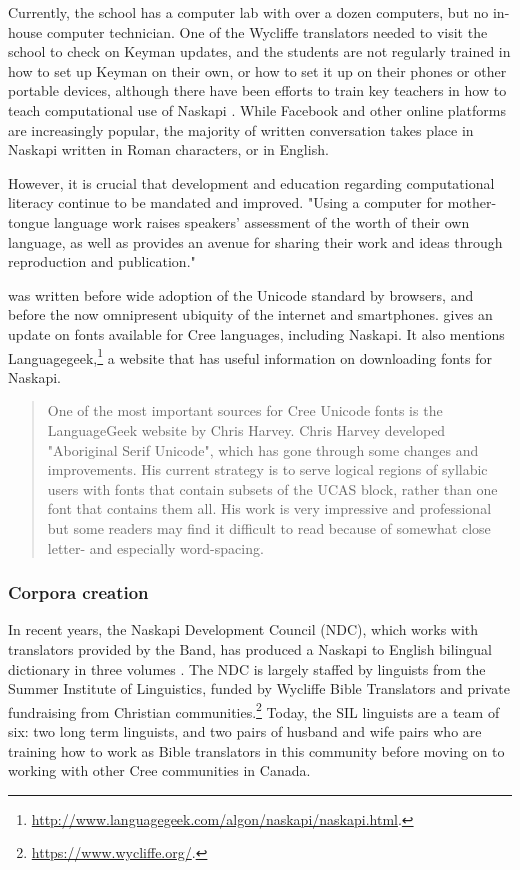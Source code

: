 Currently, the school has a computer lab with over a dozen computers, but no in-house computer technician. One of the Wycliffe translators needed to visit the school to check on Keyman updates, and the students are not regularly trained in how to set up Keyman on their own, or how to set it up on their phones or other portable devices, although there have been efforts to train key teachers in how to teach computational use of Naskapi \citep{jancewicz1998developing}. While Facebook and other online platforms are increasingly popular, the majority of written conversation takes place in Naskapi written in Roman characters, or in English.

However, it is crucial that development and education regarding computational literacy continue to be mandated and improved. "Using a computer for mother-tongue language work raises speakers' assessment of the worth of their own language, as well as provides an avenue for sharing their work and ideas through reproduction and publication." \citet{jancewicz2002applied}

\citet{jancewicz2002applied} was written before wide adoption of the Unicode standard by browsers, and before the now omnipresent ubiquity of the internet and smartphones. \citet{jancewicz2012cree} gives an update on fonts available for Cree languages, including Naskapi. It also mentions Languagegeek,\footnote{\href{http://www.languagegeek.com/algon/naskapi/naskapi.html}{http://www.languagegeek.com/algon/naskapi/naskapi.html}. } a website that has useful information on downloading fonts for Naskapi.

\begin{quote}
One of the most important sources for Cree Unicode fonts is the LanguageGeek website by Chris Harvey. Chris Harvey developed "Aboriginal Serif Unicode", which has gone through some changes and improvements. His current strategy is to serve logical regions of syllabic users with fonts that contain subsets of the UCAS block, rather than one font that contains them all. His work is very impressive and professional but some readers may find it difficult to read because of somewhat close letter- and especially word-spacing. \citep[17]{jancewicz2012cree}
\end{quote}

\subsubsection{Corpora creation}

In recent years, the Naskapi Development Council (NDC), which works with translators provided by the Band, has produced a Naskapi to English bilingual dictionary in three volumes \citep{MacKenzie-and-Jancewicz-1994}. The NDC is largely staffed by linguists from the Summer Institute of Linguistics, funded by Wycliffe Bible Translators and private fundraising from Christian communities.\footnote{\href{https://www.wycliffe.org/}{https://www.wycliffe.org/}. } Today, the SIL linguists are a team of six: two long term linguists, and two pairs of husband and wife pairs who are training how to work as Bible translators in this community before moving on to working with other Cree communities in Canada.

